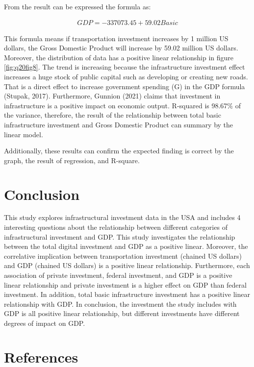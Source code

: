 \documentclass[
]{article}
\begin{document}
From the result can be expressed the formula as:

\[
\begin{align*}
{GDP} = -337073.45   + 59.02 {Basic}
\end{align*}
\]

This formula means if transportation investment increases by 1 million US dollars, the Gross Domestic Product will increase by 59.02 million US dollars. Moreover, the distribution of data has a positive linear relationship in figure \ref{fig:q20fig8}. The trend is increasing because the infrastructure investment effect increases a huge stock of public capital such as developing or creating new roads. That is a direct effect to increase government spending (G) in the GDP formula (Stupak, 2017). Furthermore, Gunnion (2021) claims that investment in infrastructure is a positive impact on economic output. R-squared is 98.67\% of the variance, therefore, the result of the relationship between total basic infrastructure investment and Gross Domestic Product can summary by the linear model.

Additionally, these results can confirm the expected finding is correct by the graph, the result of regression, and R-square.

\hypertarget{conclusion}{%
\section{Conclusion}\label{conclusion}}

This study explores infrastructural investment data in the USA and includes 4 interesting questions about the relationship between different categories of infrastructural investment and GDP. This study investigates the relationship between the total digital investment and GDP as a positive linear. Moreover, the correlative implication between transportation investment (chained US dollars) and GDP (chained US dollars) is a positive linear relationship. Furthermore, each association of private investment, federal investment, and GDP is a positive linear relationship and private investment is a higher effect on GDP than federal investment. In addition, total basic infrastructure investment has a positive linear relationship with GDP. In conclusion, the investment the study includes with GDP is all positive linear relationship, but different investments have different degrees of impact on GDP.

\hypertarget{references}{%
\section{References}\label{references}}
\end{document}
